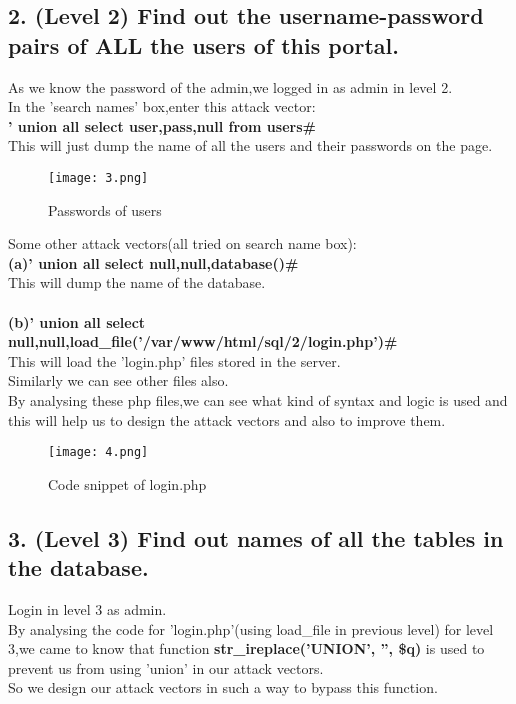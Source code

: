 \documentclass{article}
\begin{document}
\subsection*{2. (Level 2) Find out the username-password pairs of ALL the users of this portal.}
        As we know the password of the admin,we logged in as admin in level 2.\\
        In the 'search names' box,enter this attack vector:\\
        \textbf{' union all select user,pass,null from users\#}\\
        This will just dump the name of all the users and their passwords on the page.\\
        
        \begin{figure}[H]
	      \begin{center}
		\texttt{[image: 3.png]}
		\caption{Passwords of users}
	      \end{center}
	\end{figure}
	
	Some other attack vectors(all tried on search name box):\\
	\textbf{(a)\space \space' union all select null,null,database()\#}\\
	           This will dump the name of the database.\\\\
	\textbf{(b)\space \space' union all select null,null,load\_file('/var/www/html/sql/2/login.php')\#}\\
	           This will load the 'login.php' files stored in the server.\\
	           Similarly we can see other files also.\\
	           By analysing these php files,we can see what kind of syntax and logic is used and
	           this will help us to design the attack vectors and also to improve them.\\
        
        \begin{figure}[H]
	    \begin{center}
	    	\texttt{[image: 4.png]}
	    	\caption{Code snippet of login.php}
	     \end{center}
	\end{figure}
        
\subsection*{3. (Level 3) Find out names of all the tables in the database.}
           Login in level 3 as admin.\\
           By analysing the code for 'login.php'(using load\_file in previous level) for level 3,we came to know that function \textbf{str\_ireplace('UNION', '', \$q)} 
           is used to prevent us from using 'union' in our attack vectors.\\
           So we design our attack vectors in such a way to bypass this function.\\
           
\end{document}
